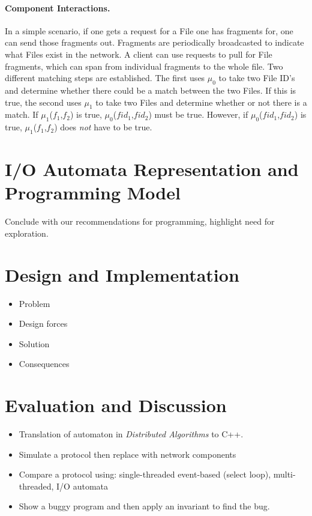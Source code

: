 \documentclass[letterpaper]{article}
\begin{document}
\paragraph {Component Interactions.}
In a simple scenario, if one gets a request for a File one has fragments for, one can send those fragments out.
Fragments are periodically broadcasted to indicate what Files exist in the network.
A client can use requests to pull for File fragments, which can span from individual fragments to the whole file.
Two different matching steps are established.
The first uses $\mu_0$ to take two File ID's and determine whether there could be a match between the two Files.  
If this is true, the second uses $\mu_1$ to take two Files and determine whether or not there is a match.
If $\mu_1$($f_1$,$f_2$) is true, $\mu_0$($fid_1$,$fid_2$) must be true.
However, if $\mu_0$($fid_1$,$fid_2$) is true, $\mu_1$($f_1$,$f_2$) does \emph{not} have to be true. 

\section{I/O Automata Representation and Programming Model\label{representation}}

Conclude with our recommendations for programming, highlight need for exploration.

\section{Design and Implementation\label{design}}

\begin{itemize}
  \item Problem
  \item Design forces
  \item Solution
  \item Consequences
\end{itemize}

\section{Evaluation and Discussion\label{evaluation}}

\begin{itemize}
\item Translation of automaton in \emph{Distributed Algorithms} to C++.
\item Simulate a protocol then replace with network components
\item Compare a protocol using: single-threaded event-based (select loop), multi-threaded, I/O automata
\item Show a buggy program and then apply an invariant to find the bug.
\end{itemize}
\end{document}
